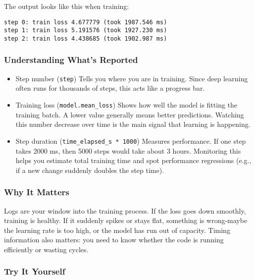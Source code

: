 \documentclass[
  letterpaper,
  DIV=11,
  numbers=noendperiod]{scrreprt}
\begin{document}
The output looks like this when training:

\begin{verbatim}
step 0: train loss 4.677779 (took 1987.546 ms)
step 1: train loss 5.191576 (took 1927.230 ms)
step 2: train loss 4.438685 (took 1902.987 ms)
\end{verbatim}

\subsubsection{Understanding What's
Reported}\label{understanding-whats-reported}

\begin{itemize}
\item
  Step number (\texttt{step}) Tells you where you are in training. Since
  deep learning often runs for thousands of steps, this acts like a
  progress bar.
\item
  Training loss (\texttt{model.mean\_loss}) Shows how well the model is
  fitting the training batch. A lower value generally means better
  predictions. Watching this number decrease over time is the main
  signal that learning is happening.
\item
  Step duration (\texttt{time\_elapsed\_s\ *\ 1000}) Measures
  performance. If one step takes 2000 ms, then 5000 steps would take
  about 3 hours. Monitoring this helps you estimate total training time
  and spot performance regressions (e.g., if a new change suddenly
  doubles the step time).
\end{itemize}

\subsubsection{Why It Matters}\label{why-it-matters-28}

Logs are your window into the training process. If the loss goes down
smoothly, training is healthy. If it suddenly spikes or stays flat,
something is wrong-maybe the learning rate is too high, or the model has
run out of capacity. Timing information also matters: you need to know
whether the code is running efficiently or wasting cycles.

\subsubsection{Try It Yourself}\label{try-it-yourself-33}
\end{document}
